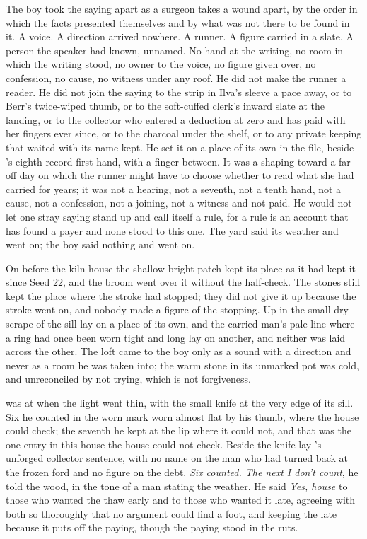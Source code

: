 The boy took the saying apart as a surgeon takes a wound apart, by the order in which the facts presented themselves and by what was not there to be found in it. A voice. A direction arrived nowhere. A runner. A figure carried in a slate. A person the speaker had known, unnamed. No hand at the writing, no room in which the writing stood, no owner to the voice, no figure given over, no confession, no cause, no witness under any roof. He did not make the runner a reader. He did not join the saying to the strip in Ilva's sleeve a pace away, or to Berr's twice-wiped thumb, or to the soft-cuffed clerk's inward slate at the landing, or to the collector who entered a deduction at zero and has paid with her fingers ever since, or to the charcoal under the shelf, or to any private keeping that waited with its name kept. He set it on a place of its own in the file, beside 's eighth record-first hand, with a finger between. It was a shaping toward a far-off day on which the runner might have to choose whether to read what she had carried for years; it was not a hearing, not a seventh, not a tenth hand, not a cause, not a confession, not a joining, not a witness and not paid. He would not let one stray saying stand up and call itself a rule, for a rule is an account that has found a payer and none stood to this one. The yard said its weather and went on; the boy said nothing and went on.

On  before the kiln-house the shallow bright patch kept its place as it had kept it since Seed 22, and the broom went over it without the half-check. The stones still kept the place where the stroke had stopped; they did not give it up because the stroke went on, and nobody made a figure of the stopping. Up in  the small dry scrape of the sill lay on a place of its own, and the carried man's pale line where a ring had once been worn tight and long lay on another, and neither was laid across the other. The loft came to the boy only as a sound with a direction and never as a room he was taken into; the warm stone in its unmarked pot was cold, and unreconciled by not trying, which is not forgiveness.

 was at  when the light went thin, with the small knife at the very edge of its sill. Six he counted in the worn mark worn almost flat by his thumb, where the house could check; the seventh he kept at the lip where it could not, and that was the one entry in this house the house could not check. Beside the knife lay 's unforged collector sentence, with no name on the man who had turned back at the frozen ford and no figure on the debt. \emph{Six counted. The next I don't count}, he told the wood, in the tone of a man stating the weather. He said \emph{Yes, house} to those who wanted the thaw early and to those who wanted it late, agreeing with both so thoroughly that no argument could find a foot, and keeping the late because it puts off the paying, though the paying stood in the ruts.

